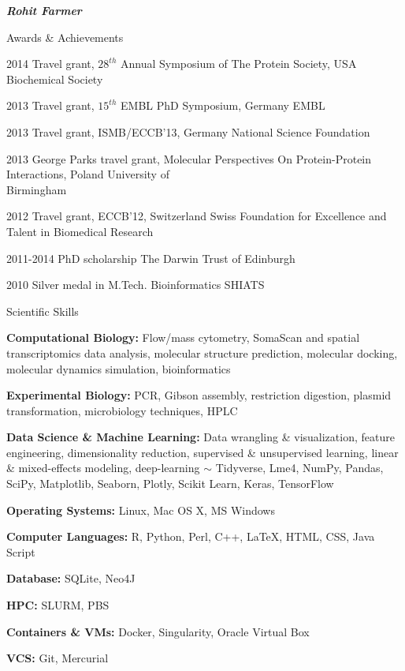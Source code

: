\documentclass[10pt]{article}
\begin{document}
\begin{cv}{\huge \it \bfseries Rohit Farmer}
\begin{cvlist}{Awards \& Achievements}
	\item[2014] Travel grant, $28^{th}$ Annual Symposium of The Protein Society, USA \hfill Biochemical Society
	\item[2013] Travel grant, $15^{th}$ EMBL PhD Symposium, Germany \hfill EMBL
	\item[2013] Travel grant, ISMB/ECCB'13, Germany \hfill National Science Foundation
	\item[2013] George Parks travel grant,  Molecular Perspectives On Protein-Protein Interactions, Poland \hfill University of \\ \hspace*{\fill} Birmingham
	\item[2012] Travel grant, ECCB'12, Switzerland \hfill Swiss Foundation for Excellence and \\ \hspace*{\fill} Talent in Biomedical Research
	\item[2011-2014] PhD scholarship \hfill The Darwin Trust of Edinburgh
	\item[2010] Silver medal in M.Tech. Bioinformatics \hfill SHIATS
\end{cvlist}

\vskip3pt
\begin{cvlist}{Scientific Skills}
	\item[\textbf{Computational Biology:}] Flow/mass cytometry, SomaScan and spatial transcriptomics data analysis, molecular structure prediction, molecular docking, molecular dynamics simulation, bioinformatics
	\item[\textbf{Experimental Biology:}] PCR, Gibson assembly, restriction digestion, plasmid transformation, microbiology techniques, HPLC
    \item[\textbf{Data Science \& Machine Learning:}] Data wrangling \& visualization, feature engineering, dimensionality reduction, supervised \& unsupervised learning, linear \& mixed-effects modeling, deep-learning $ \sim $ Tidyverse, Lme4, NumPy, Pandas, SciPy, Matplotlib, Seaborn, Plotly, Scikit Learn, Keras, TensorFlow
	\item[\textbf{Operating Systems:}] Linux, Mac OS X, MS Windows
	\item[\textbf{Computer Languages:}] R, Python, Perl, C++, \LaTeX, HTML, CSS, Java Script
	\item[\textbf{Database:}] SQLite, Neo4J
	\item[\textbf{HPC:}] SLURM, PBS
	\item[\textbf{Containers \& VMs:}] Docker, Singularity, Oracle Virtual Box
	\item[\textbf{VCS:}] Git, Mercurial
\end{cvlist}


\end{cv}
\end{document}
